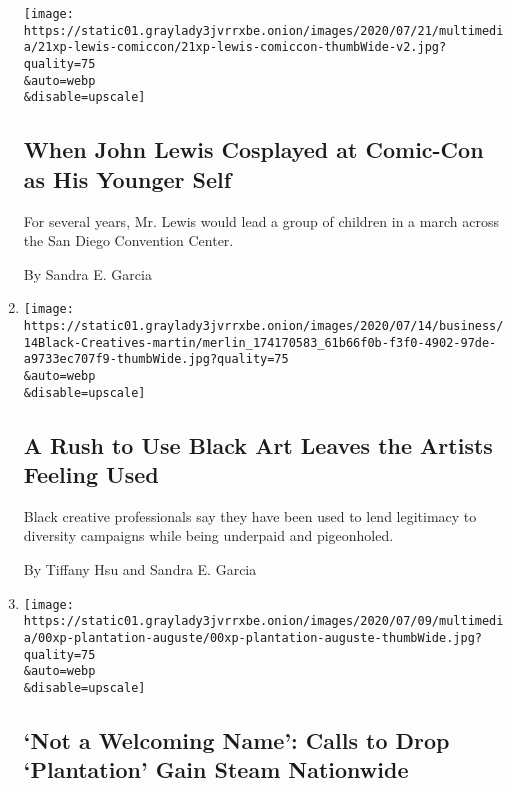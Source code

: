 \begin{enumerate}
  \texttt{[image: https://static01.graylady3jvrrxbe.onion/images/2020/07/21/multimedia/21xp-lewis-comiccon/21xp-lewis-comiccon-thumbWide-v2.jpg?quality=75\\\&auto=webp\\\&disable=upscale]}

  \hypertarget{when-john-lewis-cosplayed-at-comic-con-as-his-younger-self}{%
  \subsection{When John Lewis Cosplayed at Comic-Con as His Younger
  Self}\label{when-john-lewis-cosplayed-at-comic-con-as-his-younger-self}}

  For several years, Mr. Lewis would lead a group of children in a march
  across the San Diego Convention Center.

  By Sandra E. Garcia
\item
  \href{/2020/07/20/business/media/black-creatives-protests.html}{}

  \texttt{[image: https://static01.graylady3jvrrxbe.onion/images/2020/07/14/business/14Black-Creatives-martin/merlin\_174170583\_61b66f0b-f3f0-4902-97de-a9733ec707f9-thumbWide.jpg?quality=75\\\&auto=webp\\\&disable=upscale]}

  \hypertarget{a-rush-to-use-black-art-leaves-the-artists-feeling-used}{%
  \subsection{A Rush to Use Black Art Leaves the Artists Feeling
  Used}\label{a-rush-to-use-black-art-leaves-the-artists-feeling-used}}

  Black creative professionals say they have been used to lend
  legitimacy to diversity campaigns while being underpaid and
  pigeonholed.

  By Tiffany Hsu and Sandra E. Garcia
\item
  \href{/2020/07/11/us/plantation-fl-rhode-island.html}{}

  \texttt{[image: https://static01.graylady3jvrrxbe.onion/images/2020/07/09/multimedia/00xp-plantation-auguste/00xp-plantation-auguste-thumbWide.jpg?quality=75\\\&auto=webp\\\&disable=upscale]}

  \hypertarget{not-a-welcoming-name-calls-to-drop-plantation-gain-steam-nationwide}{%
  \subsection{`Not a Welcoming Name': Calls to Drop `Plantation' Gain
  Steam
  Nationwide}\label{not-a-welcoming-name-calls-to-drop-plantation-gain-steam-nationwide}}


\end{enumerate}
